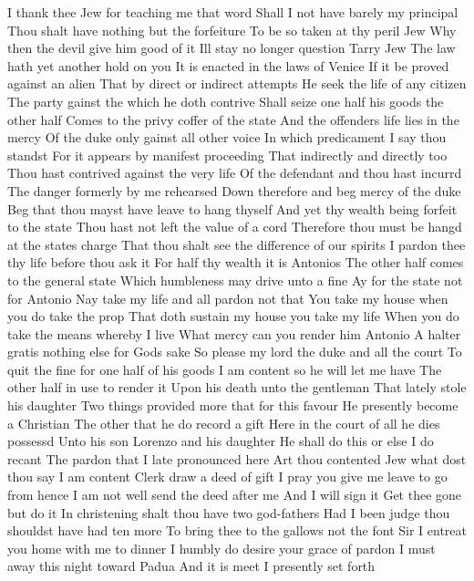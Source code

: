 I thank thee Jew for teaching me that word 
Shall I not have barely my principal 
Thou shalt have nothing but the forfeiture 
To be so taken at thy peril Jew 
Why then the devil give him good of it 
Ill stay no longer question 
Tarry Jew 
The law hath yet another hold on you 
It is enacted in the laws of Venice 
If it be proved against an alien 
That by direct or indirect attempts 
He seek the life of any citizen 
The party gainst the which he doth contrive 
Shall seize one half his goods the other half 
Comes to the privy coffer of the state 
And the offenders life lies in the mercy 
Of the duke only gainst all other voice 
In which predicament I say thou standst 
For it appears by manifest proceeding 
That indirectly and directly too 
Thou hast contrived against the very life 
Of the defendant and thou hast incurrd 
The danger formerly by me rehearsed 
Down therefore and beg mercy of the duke 
Beg that thou mayst have leave to hang thyself 
And yet thy wealth being forfeit to the state 
Thou hast not left the value of a cord 
Therefore thou must be hangd at the states charge 
That thou shalt see the difference of our spirits 
I pardon thee thy life before thou ask it 
For half thy wealth it is Antonios 
The other half comes to the general state 
Which humbleness may drive unto a fine 
Ay for the state not for Antonio 
Nay take my life and all pardon not that 
You take my house when you do take the prop 
That doth sustain my house you take my life 
When you do take the means whereby I live 
What mercy can you render him Antonio 
A halter gratis nothing else for Gods sake 
So please my lord the duke and all the court 
To quit the fine for one half of his goods 
I am content so he will let me have 
The other half in use to render it 
Upon his death unto the gentleman 
That lately stole his daughter 
Two things provided more that for this favour 
He presently become a Christian 
The other that he do record a gift 
Here in the court of all he dies possessd 
Unto his son Lorenzo and his daughter 
He shall do this or else I do recant 
The pardon that I late pronounced here 
Art thou contented Jew what dost thou say 
I am content 
Clerk draw a deed of gift 
I pray you give me leave to go from hence 
I am not well send the deed after me 
And I will sign it 
Get thee gone but do it 
In christening shalt thou have two god-fathers 
Had I been judge thou shouldst have had ten more 
To bring thee to the gallows not the font 
Sir I entreat you home with me to dinner 
I humbly do desire your grace of pardon 
I must away this night toward Padua 
And it is meet I presently set forth 
